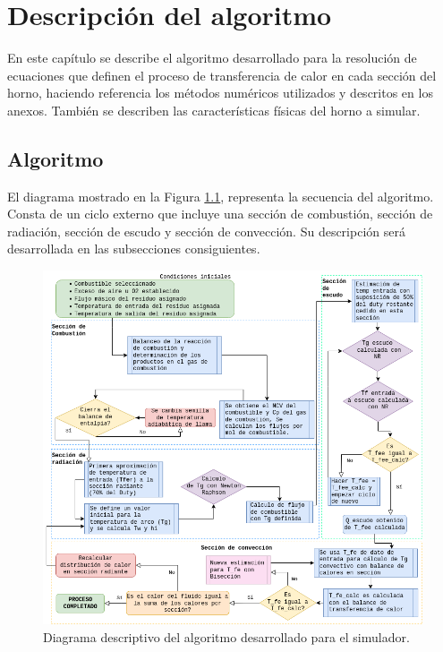 \chapter{Descripción del algoritmo}
\par En este capítulo se describe el algoritmo desarrollado para la resolución de ecuaciones que definen el proceso de transferencia de calor en cada sección del horno, haciendo referencia los métodos numéricos utilizados y descritos en los anexos. También se describen las características físicas del horno a simular.

\section{Algoritmo}
\par El diagrama mostrado en la Figura \ref{fig:diagrama-algo}, representa la secuencia del algoritmo. Consta de un ciclo externo que incluye una sección de combustión, sección de radiación, sección de escudo y sección de convección. Su descripción será desarrollada en las subsecciones consiguientes.
\begin{figure}[hbt]
\begin{center}
\includegraphics[scale=0.45]{images/diagrama-algo}
\caption[Diagrama de algoritmo]{Diagrama descriptivo del algoritmo desarrollado para el simulador.}
\label{fig:diagrama-algo}
\end{center}
\end{figure}

